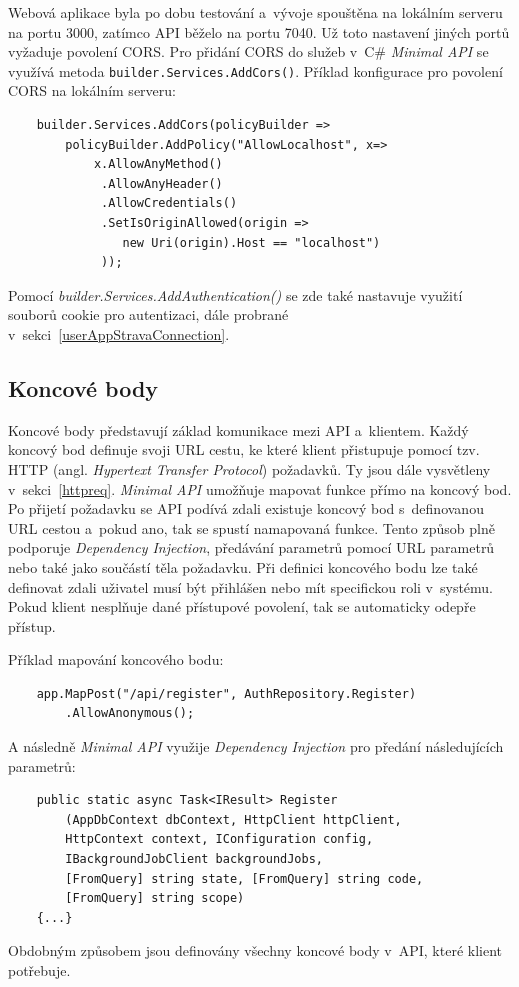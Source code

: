 Webová aplikace byla po dobu testování a~vývoje spouštěna na lokálním serveru na portu 3000, zatímco API běželo na portu 7040. Už toto nastavení jiných portů vyžaduje povolení CORS. Pro přidání CORS do služeb v~C\# \emph{Minimal API} se využívá metoda \texttt{builder.Services.AddCors()}.
Příklad konfigurace pro povolení CORS na lokálním serveru:
\begin{verbatim}
    builder.Services.AddCors(policyBuilder =>
        policyBuilder.AddPolicy("AllowLocalhost", x=> 
            x.AllowAnyMethod()
             .AllowAnyHeader()
             .AllowCredentials()
             .SetIsOriginAllowed(origin => 
                new Uri(origin).Host == "localhost")
             ));
\end{verbatim}
\noindent Pomocí \emph{builder.Services.AddAuthentication()} se zde také nastavuje využití souborů cookie pro autentizaci, dále probrané v~sekci~\ref{userAppStravaConnection}. 
\subsection{Koncové body}
Koncové body představují základ komunikace mezi API a~klientem. Každý koncový bod definuje svoji URL cestu, ke které klient přistupuje pomocí tzv. HTTP (angl. \emph{Hypertext Transfer Protocol}) požadavků. Ty jsou dále vysvětleny v~sekci~\ref{httpreq}. \emph{Minimal API} umožňuje mapovat funkce přímo na koncový bod. Po přijetí požadavku se API podívá zdali existuje koncový bod s~definovanou URL cestou a~pokud ano, tak se spustí namapovaná funkce. Tento způsob plně podporuje \emph{Dependency Injection}, předávání parametrů pomocí URL parametrů nebo také jako součástí těla požadavku. Při definici koncového bodu lze také definovat zdali uživatel musí být přihlášen nebo mít specifickou roli v~systému. Pokud klient nesplňuje dané přístupové povolení, tak se automaticky odepře přístup.    

\noindent Příklad mapování koncového bodu: 
\begin{verbatim}
    app.MapPost("/api/register", AuthRepository.Register)
        .AllowAnonymous();    
\end{verbatim}
A následně \emph{Minimal API} využije \emph{Dependency Injection} pro předání následujících parametrů: 
\begin{verbatim}
    public static async Task<IResult> Register
        (AppDbContext dbContext, HttpClient httpClient, 
        HttpContext context, IConfiguration config, 
        IBackgroundJobClient backgroundJobs,
        [FromQuery] string state, [FromQuery] string code, 
        [FromQuery] string scope)
    {...}
\end{verbatim}
\noindent Obdobným způsobem jsou definovány všechny koncové body v~API, které klient potřebuje.
